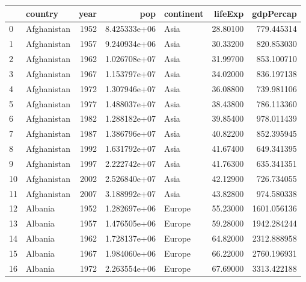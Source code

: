 \documentclass[
  letterpaper,
  DIV=11,
  numbers=noendperiod]{scrreprt}
\begin{document}
\begin{tabular}{llrrlrr}
\toprule
{} &                   country &  year &           pop & continent &   lifeExp &      gdpPercap \\
\midrule
0    &               Afghanistan &  1952 &  8.425333e+06 &      Asia &  28.80100 &     779.445314 \\
1    &               Afghanistan &  1957 &  9.240934e+06 &      Asia &  30.33200 &     820.853030 \\
2    &               Afghanistan &  1962 &  1.026708e+07 &      Asia &  31.99700 &     853.100710 \\
3    &               Afghanistan &  1967 &  1.153797e+07 &      Asia &  34.02000 &     836.197138 \\
4    &               Afghanistan &  1972 &  1.307946e+07 &      Asia &  36.08800 &     739.981106 \\
5    &               Afghanistan &  1977 &  1.488037e+07 &      Asia &  38.43800 &     786.113360 \\
6    &               Afghanistan &  1982 &  1.288182e+07 &      Asia &  39.85400 &     978.011439 \\
7    &               Afghanistan &  1987 &  1.386796e+07 &      Asia &  40.82200 &     852.395945 \\
8    &               Afghanistan &  1992 &  1.631792e+07 &      Asia &  41.67400 &     649.341395 \\
9    &               Afghanistan &  1997 &  2.222742e+07 &      Asia &  41.76300 &     635.341351 \\
10   &               Afghanistan &  2002 &  2.526840e+07 &      Asia &  42.12900 &     726.734055 \\
11   &               Afghanistan &  2007 &  3.188992e+07 &      Asia &  43.82800 &     974.580338 \\
12   &                   Albania &  1952 &  1.282697e+06 &    Europe &  55.23000 &    1601.056136 \\
13   &                   Albania &  1957 &  1.476505e+06 &    Europe &  59.28000 &    1942.284244 \\
14   &                   Albania &  1962 &  1.728137e+06 &    Europe &  64.82000 &    2312.888958 \\
15   &                   Albania &  1967 &  1.984060e+06 &    Europe &  66.22000 &    2760.196931 \\
16   &                   Albania &  1972 &  2.263554e+06 &    Europe &  67.69000 &    3313.422188 \\

\end{tabular}
\end{document}
